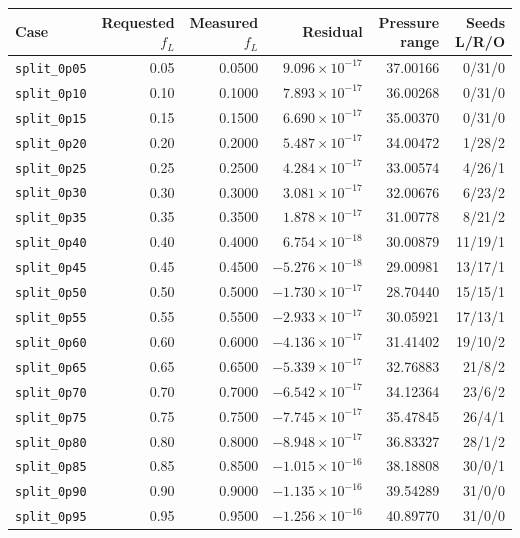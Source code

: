 \begin{center}
\small
\begin{longtable}{@{}lrrrrr@{}}
\toprule
Case & Requested \(f_L\) & Measured \(f_L\) & Residual & Pressure range & Seeds L/R/O \\
\midrule
\endhead
\texttt{split\_0p05} & 0.05 & 0.0500 & \(9.096{\times}10^{-17}\) & 37.00166 & 0/31/0 \\
\texttt{split\_0p10} & 0.10 & 0.1000 & \(7.893{\times}10^{-17}\) & 36.00268 & 0/31/0 \\
\texttt{split\_0p15} & 0.15 & 0.1500 & \(6.690{\times}10^{-17}\) & 35.00370 & 0/31/0 \\
\texttt{split\_0p20} & 0.20 & 0.2000 & \(5.487{\times}10^{-17}\) & 34.00472 & 1/28/2 \\
\texttt{split\_0p25} & 0.25 & 0.2500 & \(4.284{\times}10^{-17}\) & 33.00574 & 4/26/1 \\
\texttt{split\_0p30} & 0.30 & 0.3000 & \(3.081{\times}10^{-17}\) & 32.00676 & 6/23/2 \\
\texttt{split\_0p35} & 0.35 & 0.3500 & \(1.878{\times}10^{-17}\) & 31.00778 & 8/21/2 \\
\texttt{split\_0p40} & 0.40 & 0.4000 & \(6.754{\times}10^{-18}\) & 30.00879 & 11/19/1 \\
\texttt{split\_0p45} & 0.45 & 0.4500 & \(-5.276{\times}10^{-18}\) & 29.00981 & 13/17/1 \\
\texttt{split\_0p50} & 0.50 & 0.5000 & \(-1.730{\times}10^{-17}\) & 28.70440 & 15/15/1 \\
\texttt{split\_0p55} & 0.55 & 0.5500 & \(-2.933{\times}10^{-17}\) & 30.05921 & 17/13/1 \\
\texttt{split\_0p60} & 0.60 & 0.6000 & \(-4.136{\times}10^{-17}\) & 31.41402 & 19/10/2 \\
\texttt{split\_0p65} & 0.65 & 0.6500 & \(-5.339{\times}10^{-17}\) & 32.76883 & 21/8/2 \\
\texttt{split\_0p70} & 0.70 & 0.7000 & \(-6.542{\times}10^{-17}\) & 34.12364 & 23/6/2 \\
\texttt{split\_0p75} & 0.75 & 0.7500 & \(-7.745{\times}10^{-17}\) & 35.47845 & 26/4/1 \\
\texttt{split\_0p80} & 0.80 & 0.8000 & \(-8.948{\times}10^{-17}\) & 36.83327 & 28/1/2 \\
\texttt{split\_0p85} & 0.85 & 0.8500 & \(-1.015{\times}10^{-16}\) & 38.18808 & 30/0/1 \\
\texttt{split\_0p90} & 0.90 & 0.9000 & \(-1.135{\times}10^{-16}\) & 39.54289 & 31/0/0 \\
\texttt{split\_0p95} & 0.95 & 0.9500 & \(-1.256{\times}10^{-16}\) & 40.89770 & 31/0/0 \\
\bottomrule
\end{longtable}
\end{center}

